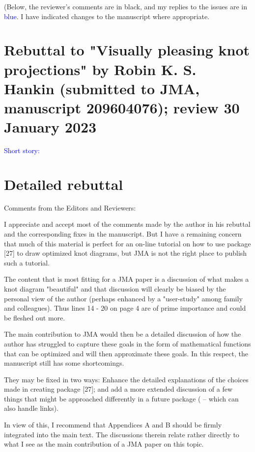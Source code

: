 \documentclass[12pt]{article}
\begin{document}
(Below, the reviewer's comments are in black, and my replies to the
issues are in \textcolor{blue}{blue}.  I have indicated changes to the
manuscript where appropriate.

\section*{Rebuttal to "Visually pleasing knot projections" by
  Robin K. S. Hankin (submitted to JMA, manuscript 209604076); review
  30 January 2023}

\textcolor{blue}{ Short story: }



\section*{Detailed rebuttal}



Comments from the Editors and Reviewers:

I appreciate and accept most of the comments made by the author in his
rebuttal and the corresponding fixes in the manuscript.  But I have a
remaining concern that much of this material is perfect for an on-line
tutorial on how to use package [27] to draw optimized knot diagrams,
but JMA is not the right place to publish such a tutorial.

The content that is most fitting for a JMA paper is a discussion of
what makes a knot diagram "beautiful"  and that discussion will
clearly be biased by the personal view of the author (perhaps enhanced
by a "user-study" among family and colleagues).  Thus lines 14 - 20 on
page 4 are of prime importance and could be fleshed out more.

The main contribution to JMA would then be a detailed discussion of
how the author has struggled to capture these goals in the form of
mathematical functions that can be optimized and will then approximate
these goals.  In this respect, the manuscript still has some
shortcomings.

They may be fixed in two ways: Enhance the detailed explanations of
the choices made in creating package [27]; and add a more extended
discussion of a few things that might be approached differently in a
future package ( -- which can also handle links).

In view of this, I recommend that Appendices A and B should be firmly
integrated into the main text.  The discussions therein relate rather
directly to what I see as the main contribution of a JMA paper on this
topic.
\end{document}
